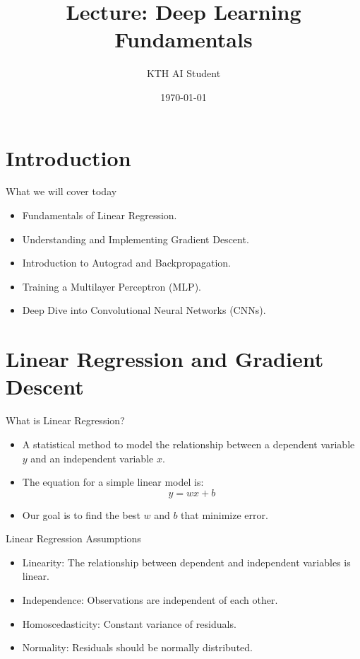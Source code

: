 \documentclass{beamer}
\title{Lecture: Deep Learning Fundamentals}
\author{KTH AI Student}
\date{\today}
\begin{document}
\frame{\titlepage}

\section{Introduction}
\begin{frame}{What we will cover today}
    \begin{itemize}
        \item Fundamentals of Linear Regression.
        \item Understanding and Implementing Gradient Descent.
        \item Introduction to Autograd and Backpropagation.
        \item Training a Multilayer Perceptron (MLP).
        \item Deep Dive into Convolutional Neural Networks (CNNs).
    \end{itemize}
\end{frame}

\section{Linear Regression and Gradient Descent}
\begin{frame}{What is Linear Regression?}
    \begin{itemize}
        \item A statistical method to model the relationship between a dependent variable \(y\) and an independent variable \(x\).
        \item The equation for a simple linear model is:
        \[
        y = wx + b
        \]
        \item Our goal is to find the best \(w\) and \(b\) that minimize error.
    \end{itemize}
\end{frame}

\begin{frame}{Linear Regression Assumptions}
    \begin{itemize}
        \item Linearity: The relationship between dependent and independent variables is linear.
        \item Independence: Observations are independent of each other.
        \item Homoscedasticity: Constant variance of residuals.
        \item Normality: Residuals should be normally distributed.
    \end{itemize}
\end{frame}
\end{document}
